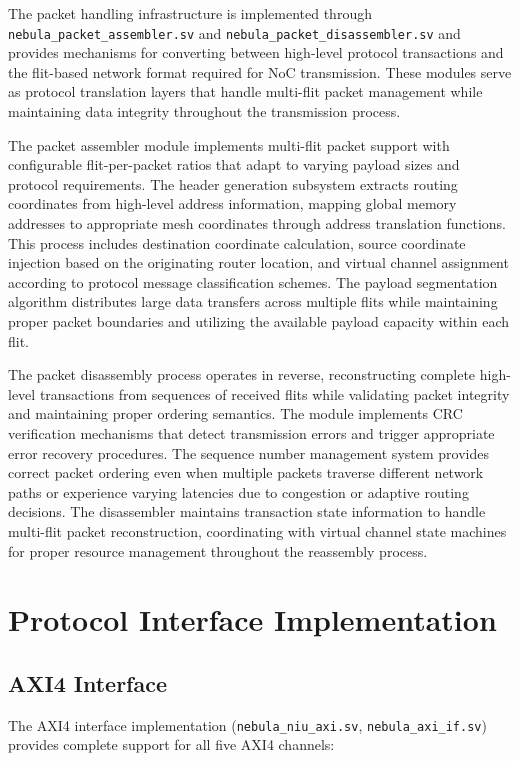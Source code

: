\documentclass[12pt,letterpaper]{article}
\begin{document}
The packet handling infrastructure is implemented through \texttt{nebula\_packet\_assembler.sv} and \texttt{nebula\_packet\_disassembler.sv} and provides mechanisms for converting between high-level protocol transactions and the flit-based network format required for NoC transmission. These modules serve as protocol translation layers that handle multi-flit packet management while maintaining data integrity throughout the transmission process.

The packet assembler module implements multi-flit packet support with configurable flit-per-packet ratios that adapt to varying payload sizes and protocol requirements. The header generation subsystem extracts routing coordinates from high-level address information, mapping global memory addresses to appropriate mesh coordinates through address translation functions. This process includes destination coordinate calculation, source coordinate injection based on the originating router location, and virtual channel assignment according to protocol message classification schemes. The payload segmentation algorithm distributes large data transfers across multiple flits while maintaining proper packet boundaries and utilizing the available payload capacity within each flit.

The packet disassembly process operates in reverse, reconstructing complete high-level transactions from sequences of received flits while validating packet integrity and maintaining proper ordering semantics. The module implements CRC verification mechanisms that detect transmission errors and trigger appropriate error recovery procedures. The sequence number management system provides correct packet ordering even when multiple packets traverse different network paths or experience varying latencies due to congestion or adaptive routing decisions. The disassembler maintains transaction state information to handle multi-flit packet reconstruction, coordinating with virtual channel state machines for proper resource management throughout the reassembly process.

\section{Protocol Interface Implementation}

\subsection{AXI4 Interface}

The AXI4 interface implementation (\texttt{nebula\_niu\_axi.sv}, \texttt{nebula\_axi\_if.sv}) provides complete support for all five AXI4 channels:
\end{document}
